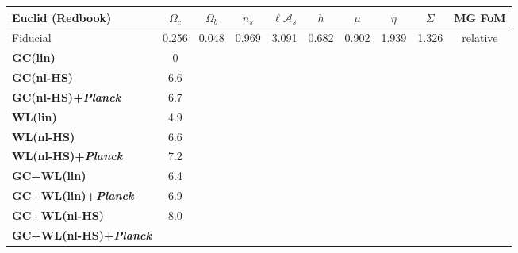 \begin{table}[htbp]
\footnotesize
\begin{tabular}{|l|c|c|c|c|c||c|c|c|c|}
\hline
\Tstrut \textbf{Euclid} (Redbook) & $\Omega_{c}$ & $\Omega_{b}$ & $n_{s}$ & $\ell\mathcal{A}_{s}$ & $h$ & $\mu$ & $\eta$ & $\Sigma$
& MG FoM  \tabularnewline
\hline 
\Tstrut Fiducial & {0.256} & {0.048} & {0.969} & {3.091} & {0.682} & {0.902} & {1.939} & {1.326} & relative\tabularnewline
\hline
\hline 
\Tstrut\textbf{GC(lin)}   
& 0 \tabularnewline
\Tstrut \textbf{GC(nl-HS)} 
& 6.6 \tabularnewline 
\Tstrut \textbf{GC(nl-HS)+{\it Planck}}  
& 6.7 \tabularnewline
\hline 
\hline 
\Tstrut \textbf{WL(lin)}  
& 4.9 \tabularnewline 
\Tstrut \textbf{WL(nl-HS)}  
& 6.6  \tabularnewline
\Tstrut \textbf{WL(nl-HS)+{\it Planck}}  
& 7.2 \tabularnewline
\hline
\hline 
\Tstrut \textbf{GC+WL(lin)}    
& 6.4  \tabularnewline
\Tstrut \textbf{GC+WL(lin)+{\it Planck}}    
& 6.9  \tabularnewline
\hline
\hline 
\Tstrut \textbf{GC+WL(nl-HS)}   
& 8.0   \tabularnewline
\Tstrut \textbf{GC+WL(nl-HS)+{\it Planck}}   

\end{tabular}
\end{table}
